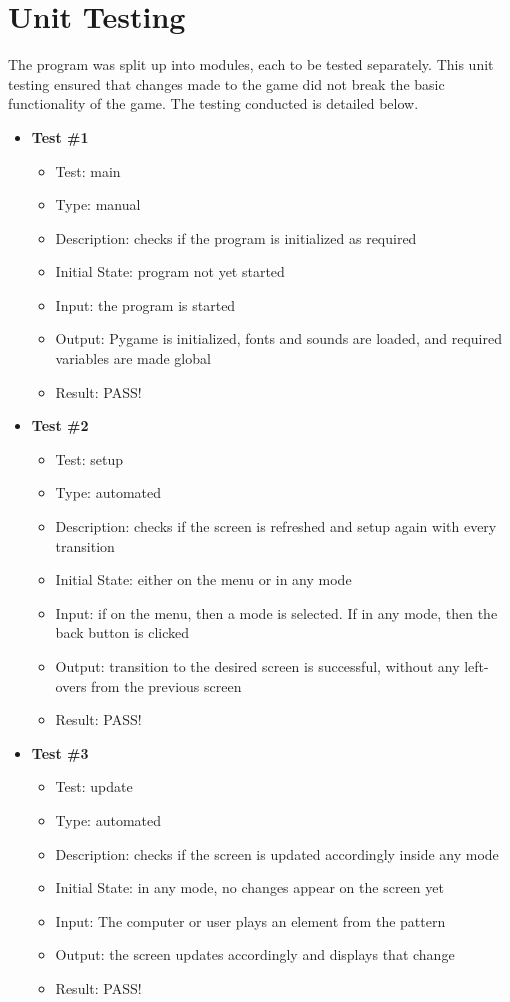 \documentclass[12pt, titlepage]{article}
\begin{document}
\section{Unit Testing}

\par The program was split up into modules, each to be tested separately. This unit testing ensured that changes made to the game did not break the basic functionality of the game. The testing conducted is detailed below.

\begin{itemize}

\item \textbf {Test \#1}
\begin{itemize}
\item{Test: main}
\item{Type: manual}
\item{Description: checks if the program is initialized as required}
\item{Initial State: program not yet started}
\item{Input: the program is started}
\item{Output: Pygame is initialized, fonts and sounds are loaded, and required variables are made global}
\item{Result: PASS!}
\end{itemize}

\item \textbf {Test \#2}
\begin{itemize}
\item{Test: setup}
\item{Type: automated}
\item{Description: checks if the screen is refreshed and setup again with every transition}
\item{Initial State: either on the menu or in any mode}
\item{Input: if on the menu, then a mode is selected. If in any mode, then the back button is clicked}
\item{Output: transition to the desired screen is successful, without any left-overs from the previous screen}
\item{Result: PASS!}
\end{itemize}

\item \textbf {Test \#3}
\begin{itemize}
\item{Test: update}
\item{Type: automated}
\item{Description: checks if the screen is updated accordingly inside any mode}
\item{Initial State: in any mode, no changes appear on the screen yet}
\item{Input: The computer or user plays an element from the pattern}
\item{Output: the screen updates accordingly and displays that change}
\item{Result: PASS!}
\end{itemize}


\end{itemize}
\end{document}
